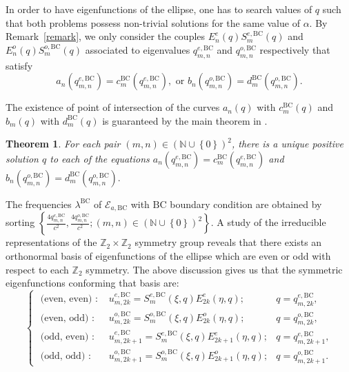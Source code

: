 \documentclass{amsart}
\newtheorem{theorem}{Theorem}[section]
\theoremstyle{definition}
\theoremstyle{remark}
\numberwithin{equation}{section}
\theoremstyle{definition}
\theoremstyle{remark}
\begin{document}
In order to have eigenfunctions of the ellipse, one has to search values of $q$ such that both problems possess non-trivial solutions for the same value of $\alpha$. By Remark~\ref{remark}, we only consider the couples $E^e_n(q)S^{e,\mathrm{BC}}_m(q)$ and $E^o_n(q)S^{o,\mathrm{BC}}_m(q)$ associated to eigenvalues $q_{m,n}^{e,\mathrm{BC}}$ and $q_{m,n}^{o,\mathrm{BC}}$ respectively that satisfy\begin{equation}
	a_n\left(q_{m,n}^{e,\mathrm{BC}}\right)=c_m^\mathrm{BC}\left(q_{m,n}^{e,\mathrm{BC}}\right),
	\text{ or }
	b_n\left(q_{m,n}^{o,\mathrm{BC}}\right)=d_m^\mathrm{BC}\left(q_{m,n}^{o,\mathrm{BC}}\right).
\end{equation}

The existence of point of intersection of the curves $a_n(q)$ with $c_m^\mathrm{BC}(q)$ and $b_m(q)$ with $d_m^\mathrm{BC}(q)$ is guaranteed  by the main theorem in \cite{Neves}.
\begin{theorem}
	For each pair $\left(m,n\right)\in\left(\mathbb{N}\cup\left\{0\right\}\right)^2$, there is a unique positive solution $q$ to each of the equations $a_n\left(q_{m,n}^{e,\mathrm{BC}}\right)=c_m^{\mathrm{BC}}\left(q_{m,n}^{e,\mathrm{BC}}\right)$ and $ b_n\left(q_{m,n}^{o,\mathrm{BC}}\right)=d_m^\mathrm{BC}\left(q_{m,n}^{o,\mathrm{BC}}\right).$
\end{theorem}

The frequencies $\lambda^\mathrm{BC}$ of $\mathcal{E}_{a,\mathrm{BC}}$ with $\mathrm{BC}$ boundary condition are obtained by sorting $\left\{\frac{4q_{m,n}^{e,\mathrm{BC}}}{c^2},\frac{4q_{m,n}^{o,\mathrm{BC}}}{c^2}; \left(m,n\right)\in\left(\mathbb{N}\cup\left\{0\right\}\right)^2\right\}$. 
A study of the irreducible representations of the $\mathbb{Z}_2\times\mathbb{Z}_2$ symmetry group reveals that there exists an orthonormal basis of eigenfunctions of the ellipse which are even or odd with respect to each $\mathbb{Z}_2$ symmetry. The above discussion gives us that the symmetric eigenfunctions conforming that basis are:
\begin{equation}
	\left\{\begin{array}{lll}
		\text { (even, even) : } & u_{m, 2 k}^{e,\mathrm{BC}}=S_m^{e,\mathrm{BC}}(\xi,q) E_{2 k}^{e}(\eta,q) ; & q=q_{m, 2 k}^{e,\mathrm{BC}}, \\
		\text { (even, odd) : } & u_{m, 2 k}^{o,\mathrm{BC}}=S_m^{o,\mathrm{BC}}(\xi,q) E_{2 k}^{o}(\eta,q); & q=q_{m, 2 k}^{o,\mathrm{BC}}, \\
		\text { (odd, even) : } & u_{m, 2 k+1}^{e,\mathrm{BC}}=S_m^{e,\mathrm{BC}}(\xi,q) E_{2 k+1}^{e}(\eta,q) ; & q=q_{m, 2 k+1}^{e,\mathrm{BC}}, \\
		\text { (odd, odd) : } & u_{m, 2 k+1}^{o,\mathrm{BC}}=S_m^{o,\mathrm{BC}}(\xi,q) E_{2 k+1}^{o}(\eta,q) ; & q=q_{m, 2 k+1}^{o,\mathrm{BC}} .
	\end{array}\right.
\end{equation}
\end{document}

